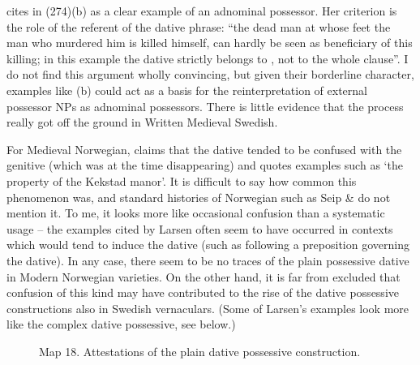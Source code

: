 
\citet[212]{Norde1997} cites in (274)(b) as a clear example of an adnominal possessor. Her criterion is the role of the referent of the dative phrase: “the dead man at whose feet the man who murdered him is killed himself, can hardly be seen as beneficiary of this killing; in this example the dative  strictly belongs to , not to the whole clause”. I do not find this argument wholly convincing, but given their borderline character, examples like (b) could act as a basis for the reinterpretation of external possessor NPs as adnominal possessors. There is little evidence that the process really got off the ground in Written Medieval Swedish.


For Medieval Norwegian, \citet{Larsen1895} claims that the dative tended to be confused with the genitive (which was at the time disappearing) and quotes examples such as  ‘the property of the Kekstad manor’. It is difficult to say how common this phenomenon was, and standard histories of Norwegian such as Seip \& \citet{Saltveit1971} do not mention it. To me, it looks more like occasional confusion than a systematic usage – the examples cited by Larsen often seem to have occurred in contexts which would tend to induce the dative (such as following a preposition governing the dative). In any case, there seem to be no traces of the plain possessive dative in Modern Norwegian varieties. On the other hand, it is far from excluded that confusion of this kind may have contributed to the rise of the dative possessive constructions also in Swedish vernaculars. (Some of Larsen’s examples look more like the complex dative possessive, see below.)




\begin{figure}[h]

\begin{minipage}{4.23958in}

\label{bkm:Ref154557005}Map 18. Attestations of the plain dative possessive construction.


\end{minipage}

\end{figure}


